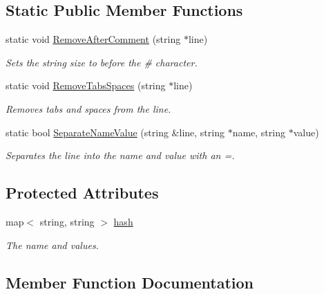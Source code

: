 \subsection*{Static Public Member Functions}
\begin{DoxyCompactItemize}
\item 
static void \hyperlink{classnix_1_1Properties_a17d9056025f9bb3005987bdf5b36f47a}{Remove\+After\+Comment} (string $\ast$line)
\begin{DoxyCompactList}\small\item\em Sets the string size to before the \textquotesingle{}\#\textquotesingle{} character. \end{DoxyCompactList}\item 
static void \hyperlink{classnix_1_1Properties_a46ce937be586f08a66eda8a9b3cfca55}{Remove\+Tabs\+Spaces} (string $\ast$line)
\begin{DoxyCompactList}\small\item\em Removes tabs and spaces from the line. \end{DoxyCompactList}\item 
static bool \hyperlink{classnix_1_1Properties_aa6c42419ed1bfaa7ae0736d1e72a2fab}{Separate\+Name\+Value} (string \&line, string $\ast$name, string $\ast$value)
\begin{DoxyCompactList}\small\item\em Separates the line into the name and value with an \textquotesingle{}=\textquotesingle{}. \end{DoxyCompactList}\end{DoxyCompactItemize}
\subsection*{Protected Attributes}
\begin{DoxyCompactItemize}
\item 
\mbox{\label{classnix_1_1Properties_a9b38d6992137ab2276724e56af0cb3cf}} 
map$<$ string, string $>$ \hyperlink{classnix_1_1Properties_a9b38d6992137ab2276724e56af0cb3cf}{hash}
\begin{DoxyCompactList}\small\item\em The name and values. \end{DoxyCompactList}\end{DoxyCompactItemize}


\subsection{Member Function Documentation}
\mbox{\label{classnix_1_1Properties_a4bfd95419c6ef1eed012b5b16513553d}} 
